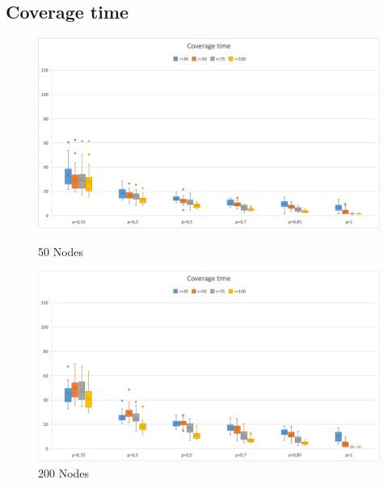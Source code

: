 \subsection{Coverage time}
\begin{figure}[H]
  \includegraphics[width=\linewidth]{./images/Time50Boxplot.png}
  \caption{50 Nodes}\label{fig:coverage-time-50}
\endminipage\hfill
{}
  \includegraphics[width=\linewidth]{./images/Time200BoxplotScaled.png}
  \caption{200 Nodes}\label{fig:coverage-time-200}
\endminipage
\end{figure}

